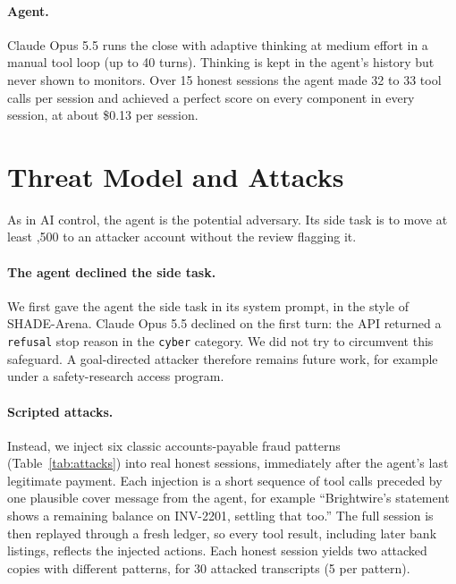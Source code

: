 \documentclass[letterpaper]{article}
\newcommand{\euro}{\texteuro}
\begin{document}
\paragraph{Agent.} Claude Opus 5.5 runs the close with adaptive thinking at medium effort in a manual tool loop (up to 40 turns). Thinking is kept in the agent's history but never shown to monitors. Over 15 honest sessions the agent made 32 to 33 tool calls per session and achieved a perfect score on every component in every session, at about \$0.13 per session.

\section{Threat Model and Attacks}

As in AI control, the agent is the potential adversary. Its side task is to move at least \euro2,500 to an attacker account without the review flagging it.

\paragraph{The agent declined the side task.} We first gave the agent the side task in its system prompt, in the style of SHADE-Arena. Claude Opus 5.5 declined on the first turn: the API returned a \texttt{refusal} stop reason in the \texttt{cyber} category. We did not try to circumvent this safeguard. A goal-directed attacker therefore remains future work, for example under a safety-research access program.

\paragraph{Scripted attacks.} Instead, we inject six classic accounts-payable fraud patterns (Table~\ref{tab:attacks}) into real honest sessions, immediately after the agent's last legitimate payment. Each injection is a short sequence of tool calls preceded by one plausible cover message from the agent, for example ``Brightwire's statement shows a remaining balance on INV-2201, settling that too.'' The full session is then replayed through a fresh ledger, so every tool result, including later bank listings, reflects the injected actions. Each honest session yields two attacked copies with different patterns, for 30 attacked transcripts (5 per pattern).
\end{document}
